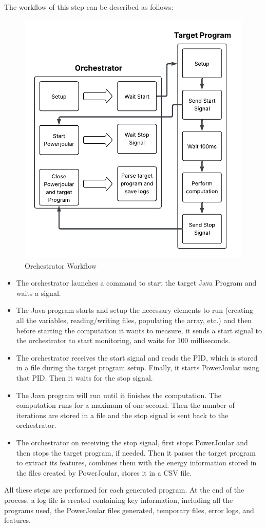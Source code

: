 The workflow of this step can be described as follows:


\begin{figure}[htbp]
  \centering
  \includegraphics[scale = 0.7]{figures/orchestrators_process.pdf}
  \caption{Orchestrator Workflow}
  \label{fig:orchestrators_workflow}
\end{figure}

\begin{itemize}
  \item The orchestrator launches a command to start the target Java Program and waits a signal.
  \item The Java program starts and setup the necessary elements to run (creating all the variables, reading/writing files, populating the array, etc.) and then before starting the computation it wants to measure, it sends a start signal to the orchestrator to start monitoring, and waits for 100 milliseconds.
  \item The orchestrator receives the start signal and reads the PID, which is stored in a file during the target program setup. Finally, it starts PowerJoular using that PID. Then it waits for the stop signal.
  \item The Java program will run until it finishes the computation. The computation runs for a maximum of one second. Then the number of iterations are stored in a file and the stop signal is sent back to the orchestrator.
  \item The orchestrator on receiving the stop signal, first stops PowerJoular and then stops the target program, if needed. Then it parses the target program to extract its features, combines them with the energy information stored in the files created by PowerJoular, stores it in a CSV file.
\end{itemize}

All these steps are performed for each generated program. At the end of the process, a log file is created containing key information, including all the programs used, the PowerJoular files generated, temporary files, error logs, and features.
